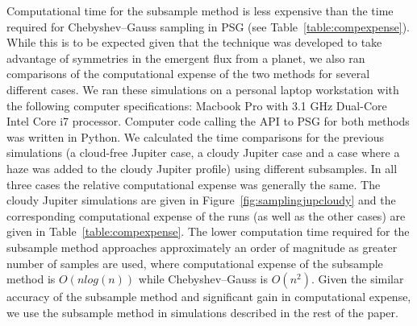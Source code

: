 \documentclass[12pt, letterpaper]{aastex631}
\begin{document}
 
Computational time for the subsample method is less expensive than the time required for Chebyshev--Gauss sampling in PSG (see Table~\ref{table:compexpense}).  While this is to be expected given that the technique was developed to take advantage of symmetries in the emergent flux from a planet, we also ran comparisons of the computational expense of the two methods for several different cases.  We ran these simulations on a personal laptop workstation with the following computer specifications: Macbook Pro with 3.1 GHz Dual-Core Intel Core i7 processor.  Computer code calling the API to PSG for both methods was written in Python. We calculated the time comparisons for the previous simulations (a cloud-free Jupiter case, a cloudy Jupiter case and a case where a haze was added to the cloudy Jupiter profile) using different subsamples. In all three cases the relative computational expense was generally the same.  The cloudy Jupiter simulations are given in Figure~\ref{fig:samplingjupcloudy} and the corresponding computational expense of the runs (as well as the other cases) are given in Table~\ref{table:compexpense}. The lower computation time required for the subsample method approaches approximately an order of magnitude as greater number of samples are used, where  computational expense of the subsample method is $O(n log(n))$ while Chebyshev--Gauss is $O(n^{2})$.  Given the similar accuracy of the subsample method and significant gain in computational expense, we use the subsample method in simulations described in the rest of the paper.  
 
\end{document}
